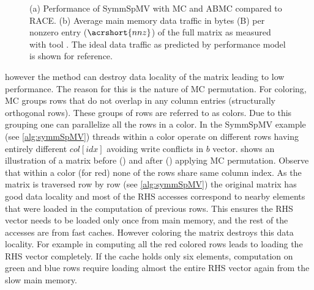 \begin{figure}[b]
	\hspace{0.5em}
	\caption{\label{fig:motivation}(a) Performance of \acrshort{SymmSpMV} with 
		\acrshort{MC} and \acrshort{ABMC} compared to \acrshort{RACE}. 
		(b) Average main memory data traffic in bytes (B) per nonzero entry ($\acrshort{nnz}$) 
		of the full matrix as measured with \LIKWID tool \cite{LIKWID}. The ideal data traffic
		as predicted by performance model is shown for reference.}
\end{figure}
however the method can destroy data locality of the matrix leading to low performance.
The reason for this is the nature of \acrlong{MC} 
permutation. For \DTWO coloring, \acrshort{MC}
groups rows that do not overlap in any column 
entries \cite{dist_k_def} (structurally orthogonal rows).
 These groups of rows are referred to as colors. 
 Due to this grouping one can parallelize all the rows in a color.
In the \acrshort{SymmSpMV} example (see \cref{alg:symmSpMV}) 
threads within a color operate on different rows having entirely different 
$col[idx]$ avoiding write conflicts in $b$ vector. 
shows an illustration of a matrix before () and 
after () applying \acrshort{MC} permutation.
Observe that within a color (for \eg red) none of the rows share same column index.
As the matrix is traversed row by row (see \cref{alg:symmSpMV}) the original matrix
has good data locality and most of the RHS accesses correspond to nearby elements 
that were loaded in the computation of previous rows.
This ensures the RHS vector needs to be loaded only
once from main memory, and the rest of the accesses are from 
fast caches. However coloring the matrix destroys this data locality. For example
in  computing all the red colored rows leads to loading the 
RHS vector completely. If the cache holds only  six elements, 
computation on green and blue rows require loading almost the entire RHS vector again 
from the slow main memory. 



